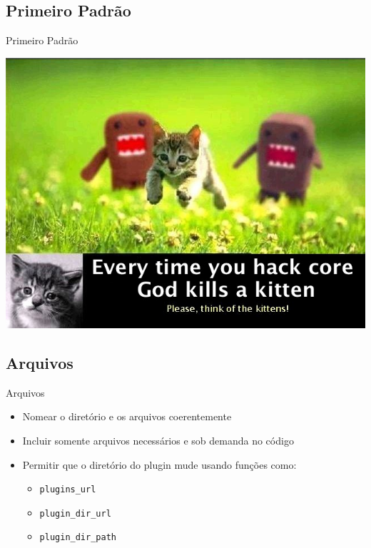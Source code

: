 \documentclass{beamer}
\begin{document}
\subsection{Primeiro Padrão}

\begin{frame}{Primeiro Padrão}
\begin{center}
  \includegraphics[height=0.8\textheight]{./img/hack-core.jpg}
\end{center}
\end{frame}

\subsection{Arquivos}

\begin{frame}{Arquivos}
\begin{itemize}
  \pause \item Nomear o diretório e os arquivos coerentemente
  \pause \item Incluir somente arquivos necessários e sob demanda no código
  \pause \item Permitir que o diretório do plugin mude usando funções como:
  \begin{itemize}
    \pause \item \texttt{plugins\_url}
    \pause \item \texttt{plugin\_dir\_url}
    \pause \item \texttt{plugin\_dir\_path}
  \end{itemize}
\end{itemize}
\end{frame}
\end{document}
